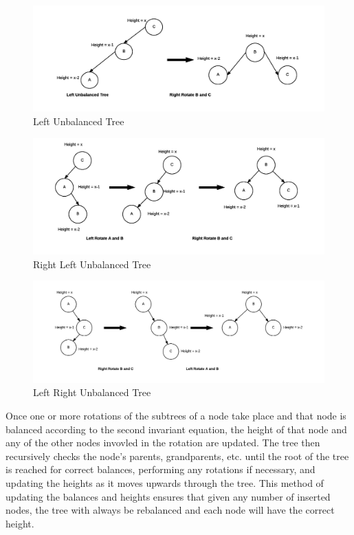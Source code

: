 \documentclass[12pt]{article}
\begin{document}
\noindent
\begin{figure}[h]
\caption{Left Unbalanced Tree}
\includegraphics[width=15cm]{left_unbalanced_tree.png}
\centering
\end{figure}
\noindent
\begin{figure}[h]
\caption{Right Left Unbalanced Tree}
\includegraphics[width=15cm]{right_left_unbalanced_tree.png}
\centering
\end{figure}
\noindent
\begin{figure}[h]
\caption{Left Right Unbalanced Tree}
\includegraphics[width=15cm]{left_right_unbalanced_tree.png}
\centering
\end{figure}
\noindent
Once one or more rotations of the subtrees of a node take place and that node
is balanced according to the second invariant equation, the height of that node
and any of the other nodes invovled in the rotation are updated.  The
tree then recursively checks the node's parents, grandparents, etc. 
until the root of the tree is reached for correct balances, performing any 
rotations if necessary, and updating the heights as it moves upwards through
the tree.  This method of updating the balances and heights ensures that given
any number of inserted nodes, the tree with always be rebalanced and each node will
have the correct height.
\end{document}
